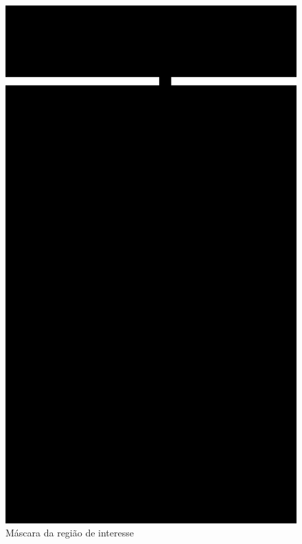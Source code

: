 \begin{figure}[H]
    \centering
    \caption{Máscara da região de interesse}
        \begin{minipage}{\sizeImg\textwidth}
            \includegraphics[width=\textwidth]{figuras/mao_barra/mask3.png}
        \end{minipage}
    \label{fig:mask}
\end{figure}


